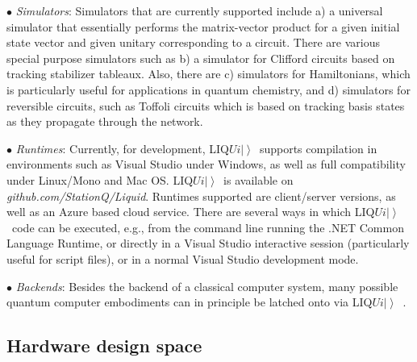 \documentclass[conference]{IEEEtran}
\newcommand{\ket}[1]{\left| #1\right\rangle}        %
\newcommand{\Liquid}{LIQ$Ui\ket{}$\ }
\begin{document}
\noindent $\bullet$ {\em Simulators}: Simulators that are currently supported include a) a universal simulator that essentially performs the matrix-vector product for a given initial state vector and given unitary corresponding to a circuit. %
There are various special purpose simulators such as b) a simulator for Clifford circuits based on tracking stabilizer tableaux. Also, there are c) simulators for Hamiltonians, which is particularly useful for applications in quantum chemistry, and d) simulators for reversible circuits, such as Toffoli circuits which is based on tracking basis states as they propagate through the network. 

\noindent $\bullet$ {\em Runtimes}: Currently, for development, \Liquid supports compilation in environments such as Visual Studio under Windows, as well as full compatibility under Linux/Mono and Mac OS. \Liquid is available on {\it github.com/StationQ/Liquid}. Runtimes supported are client/server versions, as well as an Azure based cloud service. There are several ways in which \Liquid code can be executed, e.g., from the command line running the .NET Common Language Runtime, or directly in a Visual Studio interactive session (particularly useful for script files), or in a normal Visual Studio development mode.


\noindent $\bullet$ {\em Backends}: Besides the backend of a classical computer system, many possible quantum computer embodiments can in principle be latched onto via \Liquid\!\!. 

\subsection{Hardware design space}
\end{document}
